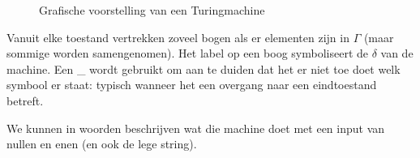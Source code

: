 \begin{figure}[h]
\caption{Grafische voorstelling van een Turingmachine\label{turing2}}
\end{figure}

Vanuit elke toestand vertrekken zoveel bogen als er elementen zijn in
$\Gamma$ (maar sommige worden samengenomen). Het label op een boog
symboliseert de $\delta$ van de machine. Een \_ wordt gebruikt om aan
te duiden dat het er niet toe doet welk symbool er staat: typisch
wanneer het een overgang naar een eindtoestand betreft.


We kunnen in woorden beschrijven wat die machine doet met een input
van nullen en enen (en ook de lege string).

